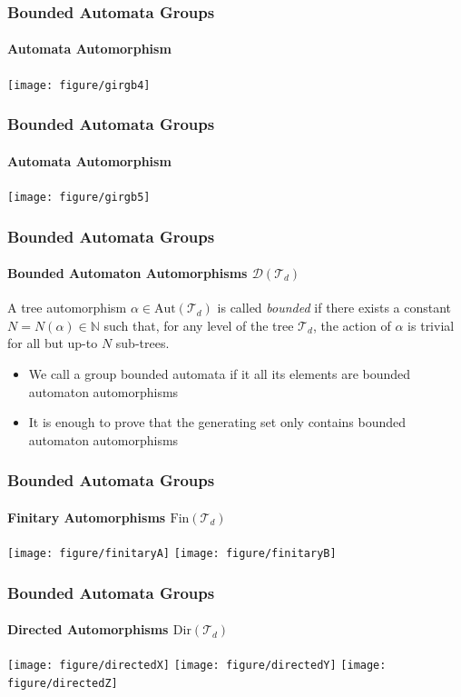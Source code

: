 \documentclass[11pt]{beamer}
\begin{document}
\begin{frame}
\frametitle{Bounded Automata Groups}
\framesubtitle{\large Automata Automorphism}
\hspace{2em}\texttt{[image: figure/girgb4]}
\end{frame}

\begin{frame}
\frametitle{Bounded Automata Groups}
\framesubtitle{\large Automata Automorphism}
\hspace{2em}\texttt{[image: figure/girgb5]}
\end{frame}


\begin{frame}
\frametitle{Bounded Automata Groups}
\framesubtitle{\large Bounded Automaton Automorphisms $\mathcal{D}(\mathcal{T}_d)$}
\begin{definition}
A tree automorphism $\alpha \in \mathrm{Aut}(\mathcal{T}_d)$ is called \emph{bounded} if there exists a constant $N = N(\alpha) \in \mathbb{N}$ such that, for any level of the tree $\mathcal{T}_d$, the action of $\alpha$ is trivial for all but up-to $N$ sub-trees.
\end{definition}

\begin{itemize}
	\item<2-> We call a group bounded automata if it all its elements are bounded automaton automorphisms
	
	\item<3-> It is enough to prove that the generating set only contains bounded automaton automorphisms
\end{itemize}

\end{frame}

\begin{frame}
\frametitle{Bounded Automata Groups}
\framesubtitle{\large Finitary Automorphisms $\mathrm{Fin}(\mathcal{T}_d)$}

\texttt{[image: figure/finitaryA]}
\hfill
\texttt{[image: figure/finitaryB]}

\end{frame}


\begin{frame}
\frametitle{Bounded Automata Groups}
\framesubtitle{\large Directed Automorphisms $\mathrm{Dir}(\mathcal{T}_d)$}

\centering

\texttt{[image: figure/directedX]}
\hspace*{-3em}
\texttt{[image: figure/directedY]}
\texttt{[image: figure/directedZ]}

\end{frame}
\end{document}
